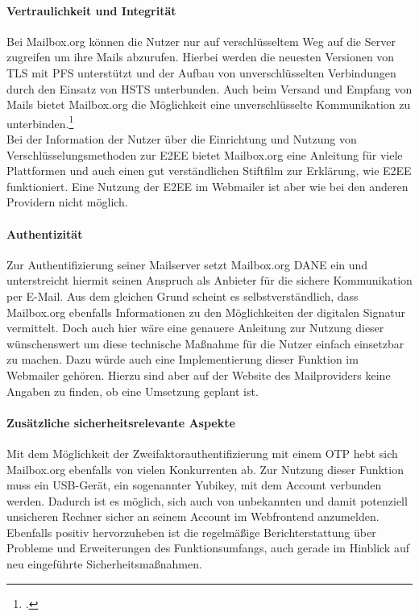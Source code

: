 \documentclass  [paper=a4,
				fontsize=12pt,
				listof=totoc,
				bibliography=totoc
				]{scrreprt}
\begin{document}
					\paragraph{Vertraulichkeit und Integrität}
						Bei Mailbox.org können die Nutzer nur auf verschlüsseltem Weg auf die Server zugreifen um ihre Mails abzurufen.
						Hierbei werden die neuesten Versionen von \ac{TLS} mit \ac{PFS} unterstützt und der Aufbau von unverschlüsselten Verbindungen durch den Einsatz von \ac{HSTS} unterbunden.
						Auch beim Versand und Empfang von Mails bietet Mailbox.org die Möglichkeit eine unverschlüsselte Kommunikation zu unterbinden.\footcite[Vgl.][]{Mailbox2014b}\medskip\\
						
						Bei der Information der Nutzer über die Einrichtung und Nutzung von Verschlüsselungsmethoden zur \ac{E2EE} bietet Mailbox.org eine Anleitung für viele Plattformen und auch einen gut verständlichen Stiftfilm zur Erklärung, wie \ac{E2EE} funktioniert.
						Eine Nutzung der \ac{E2EE} im Webmailer ist aber wie bei den anderen Providern nicht möglich.
						
					\paragraph{Authentizität}
						Zur Authentifizierung seiner Mailserver setzt Mailbox.org \ac{DANE} ein und unterstreicht hiermit seinen Anspruch als Anbieter für die sichere Kommunikation per E-Mail.
						Aus dem gleichen Grund scheint es selbstverständlich, dass Mailbox.org ebenfalls Informationen zu den Möglichkeiten der digitalen Signatur vermittelt.
						Doch auch hier wäre eine genauere Anleitung zur Nutzung dieser wünschenswert um diese technische Maßnahme für die Nutzer einfach einsetzbar zu machen.
						Dazu würde auch eine Implementierung dieser Funktion im Webmailer gehören.
						Hierzu sind aber auf der Website des Mailproviders keine Angaben zu finden, ob eine Umsetzung geplant ist.
						
					\paragraph{Zusätzliche sicherheitsrelevante Aspekte}
						Mit dem Möglichkeit der Zweifaktorauthentifizierung mit einem \ac{OTP} hebt sich Mailbox.org ebenfalls von vielen Konkurrenten ab.
						Zur Nutzung dieser Funktion muss ein USB-Gerät, ein sogenannter Yubikey, mit dem Account verbunden werden.
						Dadurch ist es möglich, sich auch von unbekannten und damit potenziell unsicheren Rechner sicher an seinem Account im Webfrontend anzumelden.
						Ebenfalls positiv hervorzuheben ist die regelmäßige Berichterstattung über Probleme und Erweiterungen des Funktionsumfangs, auch gerade im Hinblick auf neu eingeführte Sicherheitsmaßnahmen.
						
\end{document}

